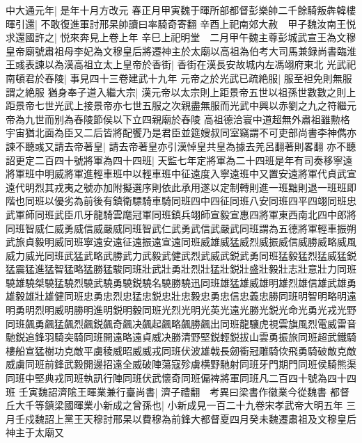 中大通元年|{
	是年十月方改元}
春正月甲寅魏于暉所部都督彭樂帥二千餘騎叛犇韓樓暉引還|{
	不敢復進軍討邢杲帥讀曰率騎奇寄翻}
辛酉上祀南郊大赦　甲子魏汝南王悦求還國許之|{
	悦來奔見上卷上年}
辛巳上祀明堂　二月甲午魏主尊彭城武宣王為文穆皇帝廟號肅祖母李妃為文穆皇后將遷神主於太廟以高祖為伯考大司馬兼録尚書臨淮王彧表諫以為漢高祖立太上皇帝於香街|{
	香街在漢長安故城内左馮翊府東北}
光武祀南頓君於舂陵|{
	事見四十三卷建武十九年}
元帝之於光武已疏絶服|{
	服至袒免則無服謂之絶服}
猶身奉子道入繼大宗|{
	漢元帝以太宗則上距景帝五世以祖孫世數數之則上距景帝七世光武上接景帝亦七世五服之次親盡無服而光武中興以赤劉之九之符繼元帝為九世而别為舂陵節侯以下立四親廟於舂陵}
高祖德洽寰中道超無外肅祖雖勲格宇宙猶北面為臣又二后皆將配饗乃是君臣並筵嫂叔同室竊謂不可吏部尚書李神儁亦諫不聽彧又請去帝著皇|{
	請去帝著皇亦引漢悼皇共皇為據去羌呂翻著則畧翻}
亦不聽　詔更定二百四十號將軍為四十四班|{
	天監七年定將軍為二十四班是年有司奏移寧遠將軍班中明威將軍進輕車班中以輕車班中征遠度入寧遠班中又置安遠將軍代貞武宣遠代明烈其戎夷之號亦加附擬選序則依此承用遂以定制轉則進一班黜則退一班班即階也同班以優劣為前後有鎮衛驃騎車騎同班四中四征同班八安同班四平四翊同班忠武軍師同班武臣爪牙龍騎雲麾冠軍同班鎮兵翊師宣毅宣惠四將軍東西南北四中郎將同班智威仁威勇威信威嚴威同班智武仁武勇武信武嚴武同班謂為五德將軍輕車振朔武旅貞毅明威同班寧遠安遠征遠振遠宣遠同班威雄威猛威烈威振威信威勝威略威風威力威光同班武猛武略武勝武力武毅武健武烈武威武鋭武勇同班猛毅猛烈猛威猛鋭猛震猛進猛智猛略猛勝猛駿同班壯武壯勇壯烈壯猛壯鋭壯盛壯毅壯志壯意壯力同班驍雄驍桀驍猛驍烈驍武驍勇驍鋭驍名驍勝驍迅同班雄猛雄威雄明雄烈雄信雄武雄勇雄毅雄壯雄健同班忠勇忠烈忠猛忠鋭忠壯忠毅忠勇忠信忠義忠勝同班明智明略明遠明勇明烈明威明勝明進明鋭明毅同班光烈光明光英光遠光勝光鋭光命光勇光戎光野同班飆勇飆猛飆烈飆鋭飆奇飆决飆起飆略飆勝飆出同班龍驤虎視雲旗風烈電威雷音馳鋭追鋒羽騎突騎同班開遠略遠貞威决勝清野堅鋭輕鋭拔山雲勇振旅同班超武鐵騎樓船宣猛樹功克敵平虜稜威昭威威戎同班伏波雄戟長劒衝冠雕騎佽飛勇騎破敵克敵威虜同班前鋒武毅開邊招遠全威破陣蕩寇殄虜横野馳射同班牙門期門同班侯騎熊渠同班中堅典戎同班執訊行陣同班伏武懷奇同班偏禆將軍同班凡二百四十號為四十四班}
壬寅魏詔濟隂王暉業兼行臺尚書|{
	濟子禮翻　考異曰梁書作徽業今從魏書}
都督丘大千等鎮梁國暉業小新成之曾孫也|{
	小新成見一百二十九卷宋孝武帝大明五年}
三月壬戍魏詔上黨王天穆討邢杲以費穆為前鋒大都督夏四月癸未魏遷肅祖及文穆皇后神主于太廟又

